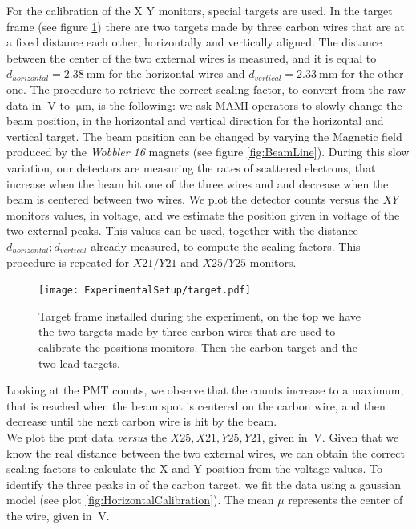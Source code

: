 For the calibration of the X Y monitors, special targets are used. In the target frame (see figure \ref{fig:targetFrame}) there are two targets made by three carbon wires that are at a fixed distance each other, horizontally and vertically aligned. The distance between the center of the two external wires is measured, and it is equal to $ d_{horizontal} = \SI{2.38}{\milli \meter}$ for the horizontal wires and $d_{vertical} = \SI{2.33}{\milli \meter}$ for the other one.
The procedure to retrieve the correct scaling factor, to convert from the raw-data in $\SI{}{\volt}$ to $\SI{}{\micro \meter}$, is the following: we ask MAMI operators to slowly change the beam position, in the horizontal and vertical direction for the horizontal and vertical target. The beam position can be changed by varying the Magnetic field produced by the \textit{Wobbler 16} magnets (see figure \ref{fig:BeamLine}). 
During this slow variation, our detectors are measuring the rates of scattered electrons, that increase when the beam hit one of the three wires and and decrease when the beam is centered between two wires. We plot the detector counts versus the $XY$ monitors values, in voltage, and we estimate the position given in voltage of the two external peaks. This values can be used, together with the distance $d_{horizontal};d_{vertical}$ already measured, to compute the scaling factors. This procedure is repeated for $X21/Y21$ and $X25/Y25$ monitors.

\newpage
\begin{figure}[htb]
\centering
\texttt{[image: ExperimentalSetup/target.pdf]}
\caption{Target frame installed during the experiment, on the top we have the two targets made by three carbon wires that are used to calibrate the positions monitors. Then the carbon target and the two lead targets.}
\label{fig:targetFrame}
\end{figure}


Looking at the PMT counts, we observe that the counts increase to a maximum, that is reached when the beam spot is centered on the carbon wire, and then decrease until the next carbon wire is hit by the beam.\\
We plot the pmt data \textit{versus} the $X25,X21,Y25,Y21$, given in $\SI{}{\volt}$. 
Given that we know the real distance between the two external wires, we can obtain the correct scaling factors to calculate the X and Y position from the voltage values. To identify the three peaks in of the carbon target, we fit the data using a gaussian model (see plot \ref{fig:HorizontalCalibration}). The mean $\mu$ represents the center of the wire, given in $\SI{}{\volt}$.


